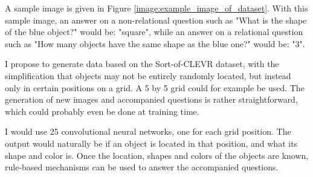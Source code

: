 \documentclass{setup}
\begin{document}
	A sample image is given in Figure \ref{image:example_image_of_dataset}. With this sample image, an answer on a non-relational question such as "What is the shape of the blue object?" would be: "square", while an answer on a relational question such as "How many objects have the same shape as the blue one?" would be: "3".

	I propose to generate data based on the Sort-of-CLEVR dataset, with the simplification that objects may not be entirely randomly located, but instead only in certain positions on a grid. A 5 by 5 grid could for example be used. The generation of new images and accompanied questions is rather straightforward, which could probably even be done at training time.
	
	I would use 25 convolutional neural networks, one for each grid position. The output would naturally be if an object is located in that position, and what its shape and color is. Once the location, shapes and colors of the objects are known, rule-based mechanisms can be used to answer the accompanied questions.

	 
	 
	
\end{document}

